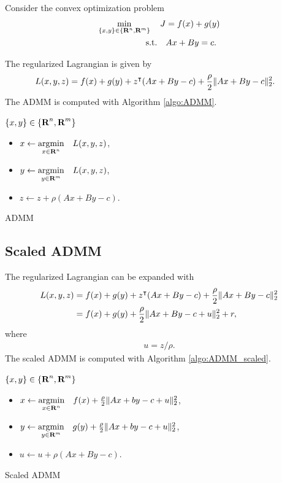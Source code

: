 \documentclass{article}
\begin{document}
    Consider the convex optimization problem
    \begin{align*}
        \min_{\{x,y\}\in\{\textbf{R}^n,\textbf{R}^m\}}\quad J&=f(x)+g(y)\\
        \text{s.t.}\quad &Ax+By=c.
    \end{align*}

    The regularized Lagrangian is given by 
    \begin{align}
        L(x,y,z)&=f(x)+g(y)+z^\intercal (Ax+By-c)+\frac{\rho}{2}\|Ax+By-c\|_2^2.
    \end{align}
    The ADMM is computed with Algorithm \ref{algo:ADMM}.

    \begin{algorithm}[H]
        \SetAlgoLined
        $\{x,y\} \in\{\textbf{R}^n,\textbf{R}^m\}$\\
        {
            \begin{itemize}
                \item $x\leftarrow \underset{x\in\textbf{R}^n}{\text{argmin}} \quad L(x,y,z)$,
                \item $y\leftarrow \underset{y\in\textbf{R}^m}{\text{argmin}} \quad L(x,y,z)$,
                \item $z\leftarrow z + \rho (Ax+By-c)$.
            \end{itemize}
        }
    \caption{ADMM}
    \label{algo:ADMM}
    \end{algorithm}

\subsection{Scaled ADMM}

    The regularized Lagrangian can be expanded with
    \begin{align}
        L(x,y,z)&=f(x)+g(y)+z^\intercal (Ax+By-c)+\frac{\rho}{2}\|Ax+By-c\|_2^2\nonumber\\
        &=f(x)+g(y)+\frac{\rho}{2}\|Ax+By-c+u\|_2^2+r,
    \end{align}
    where
    \begin{align*}
        u = z/\rho.
    \end{align*}
    The scaled ADMM is computed with Algorithm \ref{algo:ADMM_scaled}.

    \begin{algorithm}[H]
        \SetAlgoLined
        $\{x,y\} \in\{\textbf{R}^n,\textbf{R}^m\}$\\
        {
            \begin{itemize}
                \item $x\leftarrow \underset{x\in\textbf{R}^n}{\text{argmin}} \quad f(x)+\frac{\rho}{2}\|Ax+by-c+u\|_2^2$,
                \item $y\leftarrow \underset{y\in\textbf{R}^m}{\text{argmin}} \quad g(y)+\frac{\rho}{2}\|Ax+by-c+u\|_2^2$,
                \item $u\leftarrow u + \rho (Ax+By-c)$.
            \end{itemize}
        }
    \caption{Scaled ADMM}
    \label{algo:ADMM_scaled}
    \end{algorithm}
\clearpage
\end{document}
